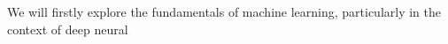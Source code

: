 We will firstly explore the fundamentals of machine learning, particularly in the context of deep neural 